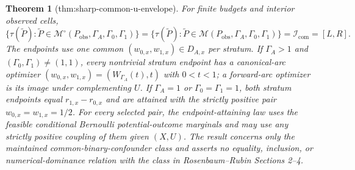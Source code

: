 \documentclass{article}
\newtheorem{theorem}{Theorem}
\begin{document}
\begin{theorem}[thm:sharp-common-u-envelope]\label{thm:sharp-common-u-envelope}
For finite budgets and interior observed cells,
\[
 \{\tau(\widetilde P):\widetilde P\in\mathcal M^{\circ}(P_{\mathrm{obs}},\Gamma_A,\Gamma_0,\Gamma_1)\}
 =\{\tau(\widetilde P):\widetilde P\in\mathcal M(P_{\mathrm{obs}},\Gamma_A,\Gamma_0,\Gamma_1)\}
 =\mathcal I_{\mathrm{com}}=[L,R].
\]
The endpoints use one common \((w_{0,x},w_{1,x})\in D_{A,x}\) per stratum.  If \(\Gamma_A>1\) and \((\Gamma_0,\Gamma_1)\neq(1,1)\), every nontrivial stratum endpoint has a canonical-arc optimizer \((w_{0,x},w_{1,x})=(W_{\Gamma_A}(t),t)\) with \(0<t<1\); a forward-arc optimizer is its image under complementing \(U\).  If \(\Gamma_A=1\) or \(\Gamma_0=\Gamma_1=1\), both stratum endpoints equal \(r_{1,x}-r_{0,x}\) and are attained with the strictly positive pair \(w_{0,x}=w_{1,x}=1/2\).  For every selected pair, the endpoint-attaining law uses the feasible conditional Bernoulli potential-outcome marginals and may use any strictly positive coupling of them given \((X,U)\).  The result concerns only the maintained common-binary-confounder class and asserts no equality, inclusion, or numerical-dominance relation with the class in Rosenbaum--Rubin Sections 2--4.
\end{theorem}
\end{document}
